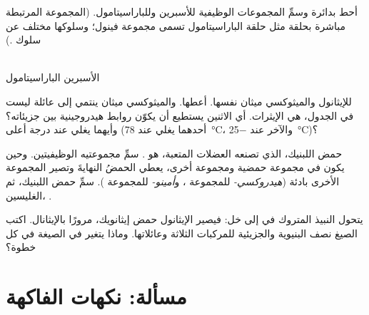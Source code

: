 \begin{exercise}[$\star\star\star$]\label{exo:g11:functional-groups:12}
أحط بدائرة وسمِّ المجموعات الوظيفية للأسبرين وللباراسيتامول.
(المجموعة  المرتبطة مباشرة بحلقة مثل حلقة الباراسيتامول تسمى
مجموعة فينول؛ وسلوكها مختلف عن سلوك .)
\begin{center}
\qquad
{}
\\[2pt] \small الأسبرين \hspace{4.2cm} الباراسيتامول
\end{center}
\end{exercise}

\begin{exercise}[$\star\star\star$]\label{exo:g11:functional-groups:13}
للإيثانول  والميثوكسي ميثان   نفسها. أعطها. والميثوكسي ميثان ينتمي إلى عائلة ليست في
الجدول، هي الإيثرات. أي الاثنين يستطيع أن يكوّن روابط هيدروجينية بين
جزيئاته؟ وأيهما يغلي عند درجة أعلى (أحدهما يغلي عند \qty{78}{\celsius}،
والآخر عند \qty{-25}{\celsius})؟
\end{exercise}

\begin{exercise}[$\star\star\star$]\label{exo:g11:functional-groups:14}
حمض اللبنيك، الذي تصنعه العضلات المتعبة، هو
. سمِّ مجموعتيه الوظيفيتين. وحين يكون في
 مجموعة حمضية ومجموعة أخرى، يعطي الحمضُ النهايةَ وتصير المجموعة الأخرى بادئة
(\emph{هيدروكسي-} للمجموعة ، و\emph{أمينو-} للمجموعة
). سمِّ حمض اللبنيك، ثم الغليسين،
.
\end{exercise}

\begin{exercise}[$\star\star\star$]\label{exo:g11:functional-groups:15}
يتحول النبيذ المتروك في  إلى خل: فيصير الإيثانول حمض إيثانويك، مرورًا
بالإيثانال. اكتب الصيغ نصف البنيوية والجزيئية للمركبات الثلاثة وعائلاتها.
وماذا يتغير في الصيغة في كل
خطوة؟
\end{exercise}

\section{مسألة: نكهات الفاكهة}

